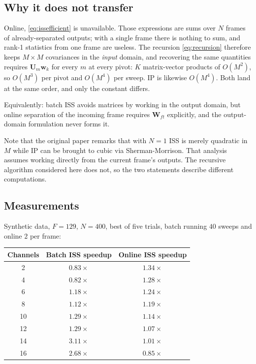 \documentclass[11pt,a4paper]{article}
\newcommand{\W}{\boldsymbol{W}}
\newcommand{\U}{\boldsymbol{U}}
\newcommand{\w}{\boldsymbol{w}}
\begin{document}
\subsection{Why it does not transfer}

Online, \eqref{eq:issefficient} is unavailable. Those expressions are sums over
$N$ frames of already-separated outputs; with a single frame there is nothing to
sum, and rank-1 statistics from one frame are useless. The recursion
\eqref{eq:recursion} therefore keeps $M\times M$ covariances in the
\emph{input} domain, and recovering the same quantities requires
$\U_m\w_k$ for every $m$ at every pivot: $K$ matrix-vector products of
$O(M^2)$, so $O(M^3)$ per pivot and $O(M^4)$ per sweep. IP is likewise $O(M^4)$.
Both land at the same order, and only the constant differs.

Equivalently: batch ISS avoids matrices by working in the output domain, but
online separation of the incoming frame requires $\W_{ft}$ explicitly, and the
output-domain formulation never forms it.

Note that the original paper remarks that with $N = 1$ ISS is merely quadratic in
$M$ while IP can be brought to cubic via Sherman-Morrison. That analysis assumes
working directly from the current frame's outputs. The recursive algorithm
considered here does not, so the two statements describe different computations.

\subsection{Measurements}

Synthetic data, $F = 129$, $N = 400$, best of five trials, batch running $40$
sweeps and online $2$ per frame:

\begin{table}[h]
\centering
\begin{tabular}{ccc}
\toprule
Channels & Batch ISS speedup & Online ISS speedup \\
\midrule
2 & $0.83\times$ & $1.34\times$ \\
4 & $0.82\times$ & $1.28\times$ \\
6 & $1.18\times$ & $1.24\times$ \\
8 & $1.12\times$ & $1.19\times$ \\
10 & $1.29\times$ & $1.14\times$ \\
12 & $1.29\times$ & $1.07\times$ \\
14 & $3.11\times$ & $1.01\times$ \\
16 & $2.68\times$ & $0.85\times$ \\
\bottomrule
\end{tabular}
\end{table}
\end{document}
